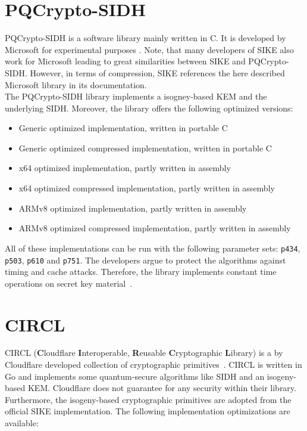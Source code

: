 \section{PQCrypto-SIDH}
PQCrypto-SIDH is a software library mainly written in C. It is developed by Microsoft for experimental purposes \parencite{microsoft2020sidh}. Note, that many developers of SIKE also work for Microsoft leading to great similarities between SIKE and PQCrypto-SIDH. However, in terms of compression, SIKE references  the here described Microsoft library in its documentation.\\
The PQCrypto-SIDH library implements a isogney-based KEM and the underlying SIDH. Moreover, the library offers the following optimized versions:
\begin{itemize}
  \item Generic optimized implementation, written in portable C
  \item Generic optimized compressed implementation, written in portable C
  \item x64 optimized implementation, partly written in assembly
  \item x64 optimized compressed implementation, partly written in assembly
  \item ARMv8 optimized implementation, partly written in assembly
  \item ARMv8 optimized compressed implementation, partly written in assembly
\end{itemize}
All of these implementations can be run with the following parameter sets: \texttt{p434}, \texttt{p503}, \texttt{p610} and \texttt{p751}. The developers argue to protect the algorithms against timing and cache attacks. Therefore, the library implements constant time operations on secret key material~\parencite{microsoft2020sidh}.

\section{CIRCL}

CIRCL (\textbf{C}loudflare \textbf{I}nteroperable, \textbf{R}eusable \textbf{C}ryptographic \textbf{L}ibrary) is a by Cloudflare developed collection of cryptographic primitives~\parencite{circl2020github}. CIRCL is written in Go and implements some quantum-secure algorithms like SIDH and an isogeny-based KEM. Cloudflare does not guarantee for any security within their library. Furthermore, the isogeny-based cryptographic primitives are adopted from the official SIKE implementation. The following implementation optimizations are available:

